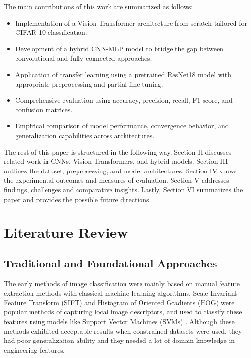 \documentclass[conference]{IEEEtran}
\begin{document}
The main contributions of this work are summarized as follows:
\begin{itemize}
    \item Implementation of a Vision Transformer architecture from scratch tailored for CIFAR-10 classification.
    \item Development of a hybrid CNN-MLP model to bridge the gap between convolutional and fully connected approaches.
    \item Application of transfer learning using a pretrained ResNet18 model with appropriate preprocessing and partial fine-tuning.
    \item Comprehensive evaluation using accuracy, precision, recall, F1-score, and confusion matrices.
    \item Empirical comparison of model performance, convergence behavior, and generalization capabilities across architectures.
\end{itemize}

The rest of this paper is structured in the following way. Section II discusses related work in CNNs, Vision Transformers, and hybrid models. Section III outlines the dataset, preprocessing, and model architectures. Section IV shows the experimental outcomes and measures of evaluation. Section V addresses findings, challenges and comparative insights. Lastly, Section VI summarizes the paper and provides the possible future directions.

\section{Literature Review}

\subsection{Traditional and Foundational Approaches}

The early methods of image classification were mainly based on manual feature extraction methods with classical machine learning algorithms. Scale-Invariant Feature Transform (SIFT) and Histogram of Oriented Gradients (HOG) were popular methods of capturing local image descriptors, and used to classify these features using models like Support Vector Machines (SVMs) \cite{lowe2004distinctive, dalal2005histograms}. Although these methods exhibited acceptable results when constrained datasets were used, they had poor generalization ability and they needed a lot of domain knowledge in engineering features.
\end{document}
